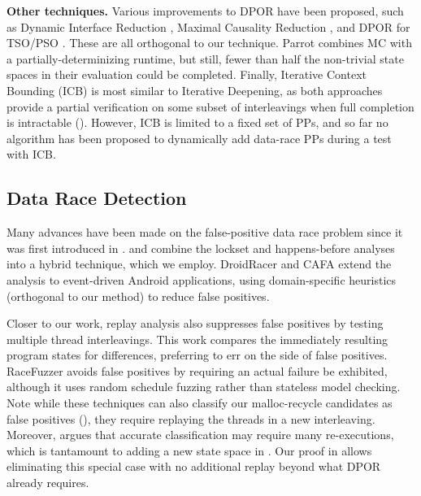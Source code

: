 {\bf Other techniques.} Various improvements to DPOR have been proposed, such as Dynamic Interface Reduction \cite{demeter}, Maximal Causality Reduction \cite{mcr}, and DPOR for TSO/PSO \cite{tsopso}.
These are all orthogonal to our technique.
Parrot \cite{parrot} combines MC with a partially-determinizing runtime, but still, fewer than half the non-trivial state spaces in their evaluation could be completed.
Finally, Iterative Context Bounding (ICB) \cite{chess-icb} is most similar to Iterative Deepening,
as both approaches provide a partial verification on some subset of interleavings when full completion is intractable (\sect{\ref{sec:future}}).
However, ICB is limited to a fixed set of PPs, and so far no algorithm has been proposed to dynamically add data-race PPs during a test with ICB.

\subsection{Data Race Detection}

Many advances have been made on the false-positive data race problem since it was first introduced in \cite{eraser}.
\cite{hybriddatarace} and \cite{tsan} combine the lockset and happens-before analyses into a hybrid technique, which we employ.
DroidRacer \cite{droidracer} and CAFA \cite{cafa} extend the analysis to event-driven Android applications, using domain-specific heuristics (orthogonal to our method) to reduce false positives. %

Closer to our work, replay analysis \cite{recordreplaydrs} also suppresses false positives by testing multiple thread interleavings.
This work compares the immediately resulting program states for differences,
preferring to err on the side of false positives.
RaceFuzzer \cite{racefuzzer} avoids false positives by requiring an actual failure be exhibited,
although it uses random schedule fuzzing rather than stateless model checking.
Note while these techniques can also classify our malloc-recycle candidates as false positives (\sect{\ref{sec:recycle}}),
they require replaying the threads in a new interleaving.
Moreover, \cite{portend} argues that accurate classification may require many re-executions,
which is tantamount to adding a new state space in \quicksand.
Our proof in \sect{\ref{sec:recycle}} allows eliminating this special case with no additional replay beyond what DPOR already requires.

